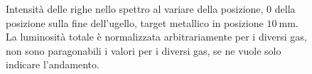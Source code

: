\documentclass[oneside,11pt,a4paper,italian]{article}
\begin{document}
\begin{figure}
 \centering
 
 
 \caption{Intensità delle righe nello spettro al variare della posizione, $0$ della posizione sulla fine dell'ugello, target metallico in posizione $\SI{10}{\milli\meter}$. La luminosità totale è normalizzata arbitrariamente per i diversi gas, non sono paragonabili i valori per i diversi gas, se ne vuole solo indicare l'andamento.}
 \label{fig:pos}
\end{figure}
\end{document}
